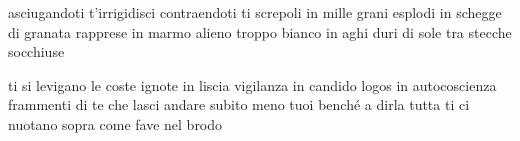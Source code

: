 \clearpage


\begin{poem}
	\begin{stanza}
		asciugandoti\verseline
		t’irrigidisci\verseline
		contraendoti\verseline
		ti screpoli\verseline
		in mille grani\verseline
		esplodi\verseline
		in schegge\verseline
		di granata\verseline
		rapprese\verseline
		in marmo alieno\verseline
		troppo bianco\verseline
		in aghi duri di sole\verseline
		tra stecche socchiuse
	\end{stanza}

	\begin{stanza}
		ti si levigano\verseline
		le coste ignote\verseline
		in liscia vigilanza\verseline
		in candido logos\verseline
		in autocoscienza\verseline
		frammenti di te\verseline
		che lasci andare\verseline
		subito meno tuoi\verseline
		benché\verseline
		a dirla tutta ti ci\verseline
		nuotano sopra come\verseline
		fave nel brodo
	\end{stanza}
\end{poem}

\clearpage


